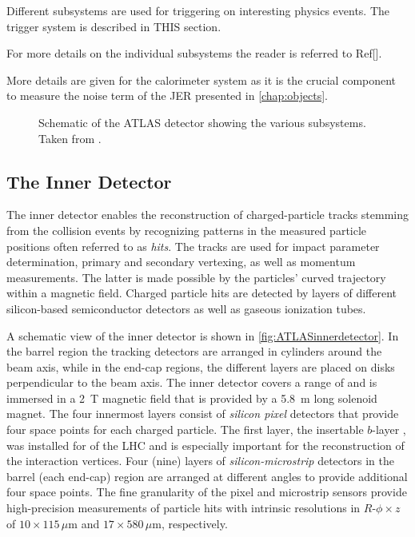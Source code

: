 Different subsystems are used for triggering on interesting physics events. The trigger system is described in THIS section.

For more details on the individual subsystems the reader is referred to Ref[].

More details are given for the calorimeter system as it is the crucial component to measure the noise term of the JER presented in \cref{chap:objects}.




\begin{figure}
    \caption[Schematic of the ATLAS detector showing the various subsystems.]{Schematic of the ATLAS detector showing the various subsystems. Taken from .}
    \label{fig:ATLASlayout}
\end{figure}

\subsection{The Inner Detector}
\label{subsec:inner-detector}
The inner detector enables the reconstruction of charged-particle tracks stemming from the collision events by recognizing patterns in the measured particle positions often referred to as \emph{hits}. The tracks are used for impact parameter determination, primary and secondary vertexing, as well as momentum measurements. The latter is made possible by the particles' curved trajectory within a magnetic field.
Charged particle hits are detected by layers of different silicon-based semiconductor detectors as well as gaseous ionization tubes.

A schematic view of the inner detector is shown in \cref{fig:ATLASinnerdetector}.
In the barrel region the tracking detectors are arranged in cylinders around the beam axis, while in the end-cap regions, the different layers are placed on disks perpendicular to the beam axis.
The inner detector covers a range of  and is immersed in a \SI{2}{\tesla} magnetic field that is provided by a \SI{5.8}{\m} long solenoid magnet.
The four innermost layers consist of \emph{silicon pixel} detectors that provide four space points for each charged particle. The first layer, the insertable $b$-layer \cite{ATLAS-TDR-19,PIX-2018-001}, was installed for \RunTwo of the LHC and is especially important for the reconstruction of the interaction vertices.
Four (nine) layers of \emph{silicon-microstrip} detectors in the barrel (each end-cap) region are arranged at different angles to provide additional four space points.
The fine granularity of the pixel and microstrip sensors provide high-precision measurements of particle hits with intrinsic resolutions in $R$-$\phi \times z$ of $10 \times 115\,\mu\text{m}$ and $17 \times 580\,\mu\text{m}$, respectively.

